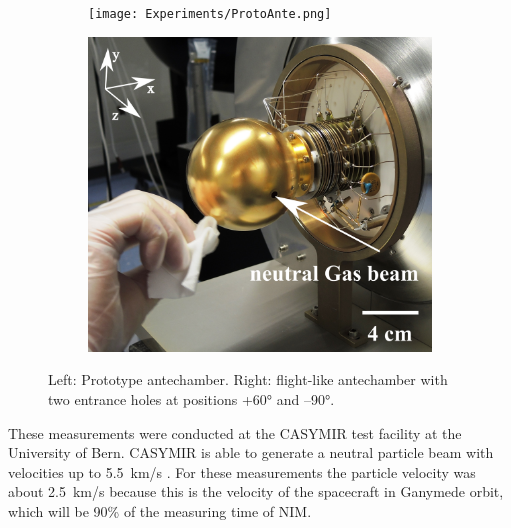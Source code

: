 	\begin{figure}[h!]
		\begin{subfigure}{.5\textwidth}
			\centering
			\texttt{[image: Experiments/ProtoAnte.png]}
		\end{subfigure}
		\begin{subfigure}{.5\textwidth}
			\centering
			\includegraphics[width=.8\textwidth]{Experiments/FlightAnte.png}
		\end{subfigure}
		\caption{Left: Prototype antechamber. Right: flight-like antechamber with two entrance holes at positions +60° and --90°.}
		\label{fig:expAntchamPic}
	\end{figure}
	These measurements were conducted at the CASYMIR test facility at the University of Bern. CASYMIR is able to generate a neutral particle beam with velocities up to 5.5~km/s \cite{CASYMIR_Graf2004}. For these measurements the particle velocity was about 2.5~km/s because this is the velocity of the spacecraft in Ganymede orbit, which will be 90\% of the measuring time of NIM.\\
